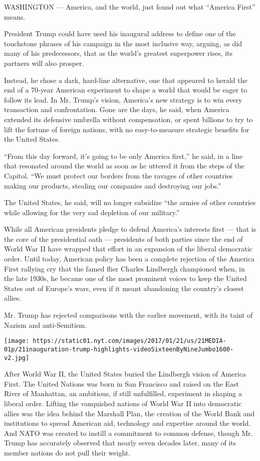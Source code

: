 WASHINGTON --- America, and the world, just found out what ``America
First'' means.

President Trump could have used his inaugural address to define one of
the touchstone phrases of his campaign in the most inclusive way,
arguing, as did many of his predecessors, that as the world's greatest
superpower rises, its partners will also prosper.

Instead, he chose a dark, hard-line alternative, one that appeared to
herald the end of a 70-year American experiment to shape a world that
would be eager to follow its lead. In Mr. Trump's vision, America's new
strategy is to win every transaction and confrontation. Gone are the
days, he said, when America extended its defensive umbrella without
compensation, or spent billions to try to lift the fortune of foreign
nations, with no easy-to-measure strategic benefits for the United
States.

``From this day forward, it's going to be only America first,'' he said,
in a line that resonated around the world as soon as he uttered it from
the steps of the Capitol. ``We must protect our borders from the ravages
of other countries making our products, stealing our companies and
destroying our jobs.''

The United States, he said, will no longer subsidize ``the armies of
other countries while allowing for the very sad depletion of our
military.''

While all American presidents pledge to defend America's interests first
--- that is the core of the presidential oath --- presidents of both
parties since the end of World War II have wrapped that effort in an
expansion of the liberal democratic order. Until today, American policy
has been a complete rejection of the America First rallying cry that the
famed flier Charles Lindbergh championed when, in the late 1930s, he
became one of the most prominent voices to keep the United States out of
Europe's wars, even if it meant abandoning the country's closest allies.

Mr. Trump has rejected comparisons with the earlier movement, with its
taint of Nazism and anti-Semitism.

\texttt{[image: https://static01.nyt.com/images/2017/01/21/us/21MEDIA-01p/21inauguration-trump-highlights-videoSixteenByNineJumbo1600-v2.jpg]}

After World War II, the United States buried the Lindbergh vision of
America First. The United Nations was born in San Francisco and raised
on the East River of Manhattan, an ambitious, if still unfulfilled,
experiment in shaping a liberal order. Lifting the vanquished nations of
World War II into democratic allies was the idea behind the Marshall
Plan, the creation of the World Bank and institutions to spread American
aid, technology and expertise around the world. And NATO was created to
instill a commitment to common defense, though Mr. Trump has accurately
observed that nearly seven decades later, many of its member nations do
not pull their weight.

